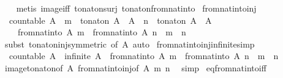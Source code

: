 \begin{isabellebody}
%
\isadelimproof
\ \ %
\endisadelimproof
%
\isatagproof
{}\isamarkupfalse%
\ {\isacharparenleft}metis\ image{\isacharunderscore}iff\ to{\isacharunderscore}nat{\isacharunderscore}on{\isacharunderscore}surj\ to{\isacharunderscore}nat{\isacharunderscore}on{\isacharunderscore}from{\isacharunderscore}nat{\isacharunderscore}into{\isacharparenright}%
\endisatagproof
{\isafoldproof}%
%
\isadelimproof
\isanewline
%
\endisadelimproof
\isanewline
{}\isamarkupfalse%
\ from{\isacharunderscore}nat{\isacharunderscore}into{\isacharunderscore}inj{\isacharcolon}\isanewline
\ \ {\isachardoublequoteopen}countable\ A\ {\isasymLongrightarrow}\ m\ {\isasymin}\ to{\isacharunderscore}nat{\isacharunderscore}on\ A\ {\isacharbackquote}\ A\ {\isasymLongrightarrow}\ n\ {\isasymin}\ to{\isacharunderscore}nat{\isacharunderscore}on\ A\ {\isacharbackquote}\ A\ {\isasymLongrightarrow}\isanewline
\ \ \ \ from{\isacharunderscore}nat{\isacharunderscore}into\ A\ m\ {\isacharequal}\ from{\isacharunderscore}nat{\isacharunderscore}into\ A\ n\ {\isasymlongleftrightarrow}\ m\ {\isacharequal}\ n{\isachardoublequoteclose}\isanewline
%
\isadelimproof
\ \ %
\endisadelimproof
%
\isatagproof
{}\isamarkupfalse%
\ {\isacharparenleft}subst\ to{\isacharunderscore}nat{\isacharunderscore}on{\isacharunderscore}inj{\isacharbrackleft}symmetric{\isacharcomma}\ of\ A{\isacharbrackright}{\isacharparenright}\ auto%
\endisatagproof
{\isafoldproof}%
%
\isadelimproof
\isanewline
%
\endisadelimproof
\isanewline
{}\isamarkupfalse%
\ from{\isacharunderscore}nat{\isacharunderscore}into{\isacharunderscore}inj{\isacharunderscore}infinite{\isacharbrackleft}simp{\isacharbrackright}{\isacharcolon}\isanewline
\ \ {\isachardoublequoteopen}countable\ A\ {\isasymLongrightarrow}\ infinite\ A\ {\isasymLongrightarrow}\ from{\isacharunderscore}nat{\isacharunderscore}into\ A\ m\ {\isacharequal}\ from{\isacharunderscore}nat{\isacharunderscore}into\ A\ n\ {\isasymlongleftrightarrow}\ m\ {\isacharequal}\ n{\isachardoublequoteclose}\isanewline
%
\isadelimproof
\ \ %
\endisadelimproof
%
\isatagproof
{}\isamarkupfalse%
\ image{\isacharunderscore}to{\isacharunderscore}nat{\isacharunderscore}on{\isacharbrackleft}of\ A{\isacharbrackright}\ from{\isacharunderscore}nat{\isacharunderscore}into{\isacharunderscore}inj{\isacharbrackleft}of\ A\ m\ n{\isacharbrackright}\ \isamarkupfalse%
\ simp%
\endisatagproof
{\isafoldproof}%
%
\isadelimproof
\isanewline
%
\endisadelimproof
\isanewline
{}\isamarkupfalse%
\ eq{\isacharunderscore}from{\isacharunderscore}nat{\isacharunderscore}into{\isacharunderscore}iff{\isacharcolon}\isanewline

\end{isabellebody}
